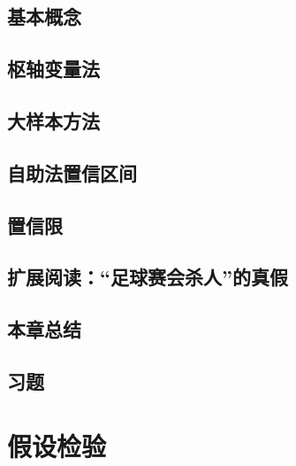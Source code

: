 \documentclass[UTF8,12pt,a4paper,fontset=fandol]{ctexbook}
\begin{document}
\section{基本概念}
\label{sec:study-interval-concepts}

\section{枢轴变量法}
\label{sec:study-pivotal-quantity}

\section{大样本方法}
\label{sec:study-large-sample-intervals}

\section{自助法置信区间}
\label{sec:study-bootstrap-intervals}

\section{置信限}
\label{sec:study-confidence-bounds}

\section{扩展阅读：“足球赛会杀人”的真假}
\label{sec:study-football-claim}

\section*{本章总结}

\section*{习题}

\chapter{假设检验}
\label{chap:study-hypothesis-testing}
\end{document}
